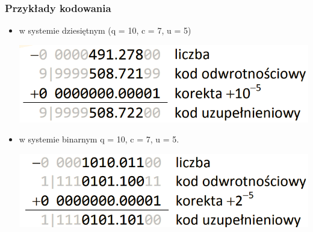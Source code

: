 \documentclass[12pt]{article}
\begin{document}
    \subsubsection{Przykłady kodowania}
    \begin{itemize}
        \item w systemie dziesiętnym (q = 10, c = 7, u = 5)
        \begin{center}
            \includegraphics[scale=0.4]{graphics/number-repr/uzp-encode-dec.png}

        \end{center}
        \item w systemie binarnym q = 10, c = 7, u = 5.
        \begin{center}
            \includegraphics[scale=0.4]{graphics/number-repr/uzp-encode-bin.png}
        \end{center}

    \end{itemize}
\end{document}
